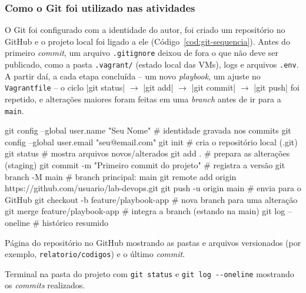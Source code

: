 \subsubsection{Como o Git foi utilizado nas atividades}

O Git foi configurado com a identidade do autor, foi criado um repositório no GitHub e o projeto local
foi ligado a ele (Código~\ref{cod:git-sequencia}). Antes do primeiro \textit{commit}, um arquivo
\texttt{.gitignore} deixou de fora o que não deve ser publicado, como a pasta \texttt{.vagrant/}
(estado local das VMs), logs e arquivos \texttt{.env}. A partir daí, a cada etapa concluída -- um
novo \textit{playbook}, um ajuste no \texttt{Vagrantfile} -- o ciclo \cod|git status| $\rightarrow$
\cod|git add| $\rightarrow$ \cod|git commit| $\rightarrow$ \cod|git push| foi repetido, e alterações
maiores foram feitas em uma \textit{branch} antes de ir para a \texttt{main}.

\begin{terminal}[caption={Comandos usados para versionar o laboratório no GitHub},label={cod:git-sequencia}]
git config --global user.name  "Seu Nome"       # identidade gravada nos commits
git config --global user.email "seu@email.com"
git init                                        # cria o repositório local (.git)
git status                                      # mostra arquivos novos/alterados
git add .                                       # prepara as alterações (staging)
git commit -m "Primeiro commit do projeto"      # registra a versão
git branch -M main                              # branch principal: main
git remote add origin https://github.com/usuario/lab-devops.git
git push -u origin main                         # envia para o GitHub
git checkout -b feature/playbook-app            # nova branch para uma alteração
git merge feature/playbook-app                  # integra a branch (estando na main)
git log --oneline                               # histórico resumido
\end{terminal}

%
  {Página do repositório no GitHub mostrando as pastas e arquivos versionados (por exemplo,
   \texttt{relatorio/codigos}) e o último \textit{commit}.}

%
  {Terminal na pasta do projeto com \texttt{git status} e \texttt{git log -{}-oneline} mostrando
   os \textit{commits} realizados.}

